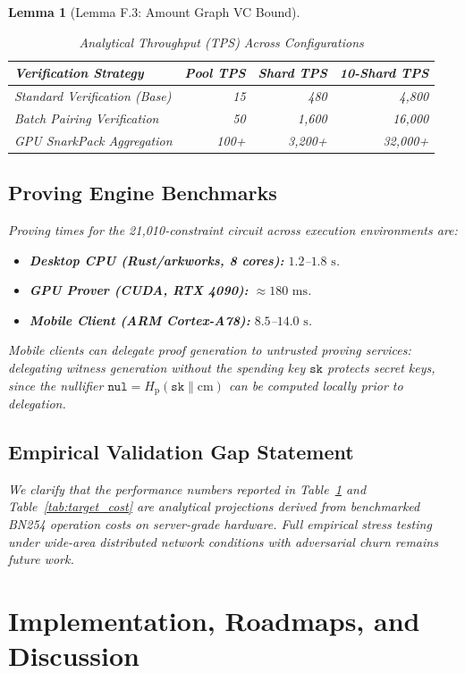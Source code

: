\documentclass[journal,10pt,twocolumn]{IEEEtran}
\newtheorem{lemma}[theorem]{Lemma}
\theoremstyle{definition}
\theoremstyle{remark}
\begin{document}
\begin{lemma}[Lemma F.3: Amount Graph VC Bound]
\begin{table}[h]
\centering
\caption{Analytical Throughput (TPS) Across Configurations}
\label{tab:tps_projections}
\begin{tabular}{lrrr}
\toprule
\textbf{Verification Strategy} & \textbf{Pool TPS} & \textbf{Shard TPS} & \textbf{10-Shard TPS} \\
\midrule
Standard Verification (Base) & 15 & 480 & 4,800 \\
Batch Pairing Verification & 50 & 1,600 & 16,000 \\
GPU SnarkPack Aggregation & 100+ & 3,200+ & 32,000+ \\
\bottomrule
\end{tabular}
\end{table}

\subsection{Proving Engine Benchmarks}
Proving times for the 21,010-constraint circuit across execution environments are:
\begin{itemize}[leftmargin=*]
    \item \textbf{Desktop CPU (Rust/arkworks, 8 cores):} $1.2$--$1.8\text{ s}$.
    \item \textbf{GPU Prover (CUDA, RTX 4090):} $\approx 180\text{ ms}$.
    \item \textbf{Mobile Client (ARM Cortex-A78):} $8.5$--$14.0\text{ s}$.
\end{itemize}
Mobile clients can delegate proof generation to untrusted proving services: delegating witness generation without the spending key $\mathtt{sk}$ protects secret keys, since the nullifier $\mathtt{nul} = H_{\text{p}}(\mathtt{sk} \parallel \text{cm})$ can be computed locally prior to delegation.

\subsection{Empirical Validation Gap Statement}
We clarify that the performance numbers reported in Table~\ref{tab:tps_projections} and Table~\ref{tab:target_cost} are analytical projections derived from benchmarked BN254 operation costs on server-grade hardware. Full empirical stress testing under wide-area distributed network conditions with adversarial churn remains future work.

\section{Implementation, Roadmaps, and Discussion}


\end{lemma}
\end{document}
